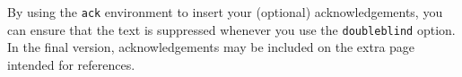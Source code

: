 \documentclass[doubleblind]{ecai}
\begin{document}










        

\begin{ack}
By using the \texttt{ack} environment to insert your (optional) 
acknowledgements, you can ensure that the text is suppressed whenever 
you use the \texttt{doubleblind} option. In the final version, 
acknowledgements may be included on the extra page intended for references.
\end{ack}



\clearpage

\end{document}
